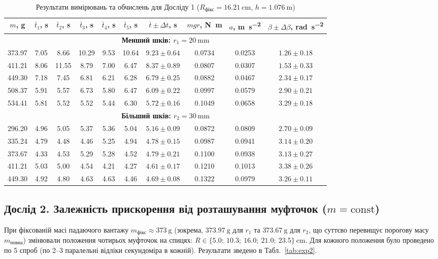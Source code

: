 \documentclass[ukrainian]{ucaphyslab}
\begin{document}
\begin{table}[H]
  \centering
  \small
  \begin{tabular}{@{}cccccccccc@{}}
    \toprule
    $m$, \si{\gram} & $\bar{t}_1$, \si{\second} & $\bar{t}_2$, \si{\second} & $\bar{t}_3$, \si{\second} & $\bar{t}_4$, \si{\second} & $\bar{t}_5$, \si{\second} & $\bar{t} \pm \Delta t$, \si{\second} & $mgr$, \si{\newton\meter} & $a$, \si{\meter\per\second\squared} & $\beta \pm \Delta\beta$, \si{\radian\per\second\squared} \\
    \midrule
    \multicolumn{10}{c}{\textbf{Менший шків: $r_1 = \SI{20}{\milli\meter}$}} \\
    \midrule
    373.97 & 7.05 & 8.66 & 10.29 & 9.53 & 10.64 & $9.23 \pm 0.64$ & 0.0734 & 0.0253 & $1.26 \pm 0.18$ \\
    411.21 & 8.06 & 11.55 & 8.79 & 7.00 & 6.47 & $8.37 \pm 0.89$ & 0.0807 & 0.0307 & $1.53 \pm 0.33$ \\
    449.30 & 7.18 & 7.45 & 6.81 & 6.21 & 6.28 & $6.79 \pm 0.25$ & 0.0882 & 0.0467 & $2.34 \pm 0.17$ \\
    508.37 & 5.91 & 5.57 & 6.73 & 5.80 & 6.47 & $6.09 \pm 0.22$ & 0.0997 & 0.0579 & $2.90 \pm 0.21$ \\
    534.41 & 5.81 & 5.52 & 5.52 & 5.44 & 6.30 & $5.72 \pm 0.16$ & 0.1049 & 0.0658 & $3.29 \pm 0.18$ \\
    \midrule
    \multicolumn{10}{c}{\textbf{Більший шків: $r_2 = \SI{30}{\milli\meter}$}} \\
    \midrule
    296.20 & 4.96 & 5.05 & 5.37 & 5.36 & 5.04 & $5.16 \pm 0.09$ & 0.0872 & 0.0809 & $2.70 \pm 0.09$ \\
    335.24 & 4.79 & 4.48 & 4.46 & 5.25 & 4.94 & $4.78 \pm 0.15$ & 0.0987 & 0.0941 & $3.14 \pm 0.20$ \\
    373.67 & 4.33 & 4.53 & 5.29 & 5.28 & 4.52 & $4.79 \pm 0.21$ & 0.1100 & 0.0938 & $3.13 \pm 0.27$ \\
    411.21 & 5.03 & 5.00 & 4.54 & 4.21 & 4.27 & $4.61 \pm 0.17$ & 0.1210 & 0.1013 & $3.38 \pm 0.26$ \\
    449.30 & 4.92 & 4.80 & 4.63 & 4.63 & 4.46 & $4.69 \pm 0.08$ & 0.1322 & 0.0979 & $3.26 \pm 0.11$ \\
    \bottomrule
  \end{tabular}
  \caption{Результати вимірювань та обчислень для Досліду 1 ($R_{\text{фікс}} = \SI{16.21}{\centi\meter}$, $h = \SI{1.076}{\meter}$)}
  \label{tab:exp1}
\end{table}

\subsection{Дослід 2. Залежність прискорення від розташування муфточок ($m = \text{const}$)}
При фіксованій масі падаючого вантажу $m_{\text{фікс}} \approx \SI{373}{\gram}$ (зокрема, $\SI{373.97}{\gram}$ для $r_1$ та $\SI{373.67}{\gram}$ для $r_2$, що суттєво перевищує порогову масу $m_{\text{повна}}$) змінювали положення чотирьох муфточок на спицях: $R \in \{5.0;\ 10.3;\ 16.0;\ 21.0;\ 23.5\}\ \si{\centi\meter}$. Для кожного положення було проведено по 5 спроб (по 2--3 паралельні відліки секундоміра в кожній). Результати зведено в Табл.~\ref{tab:exp2}.
\end{document}
